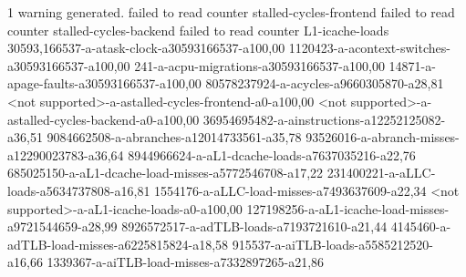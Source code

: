 1 warning generated. failed to read counter stalled-cycles-frontend failed to read counter stalled-cycles-backend failed to read counter L1-icache-loads 30593,166537-a-atask-clock-a30593166537-a100,00 1120423-a-acontext-switches-a30593166537-a100,00 241-a-acpu-migrations-a30593166537-a100,00 14871-a-apage-faults-a30593166537-a100,00 80578237924-a-acycles-a9660305870-a28,81 <not supported>-a-astalled-cycles-frontend-a0-a100,00 <not supported>-a-astalled-cycles-backend-a0-a100,00 36954695482-a-ainstructions-a12252125082-a36,51 9084662508-a-abranches-a12014733561-a35,78 93526016-a-abranch-misses-a12290023783-a36,64 8944966624-a-aL1-dcache-loads-a7637035216-a22,76 685025150-a-aL1-dcache-load-misses-a5772546708-a17,22 231400221-a-aLLC-loads-a5634737808-a16,81 1554176-a-aLLC-load-misses-a7493637609-a22,34 <not supported>-a-aL1-icache-loads-a0-a100,00 127198256-a-aL1-icache-load-misses-a9721544659-a28,99 8926572517-a-adTLB-loads-a7193721610-a21,44 4145460-a-adTLB-load-misses-a6225815824-a18,58 915537-a-aiTLB-loads-a5585212520-a16,66 1339367-a-aiTLB-load-misses-a7332897265-a21,86
